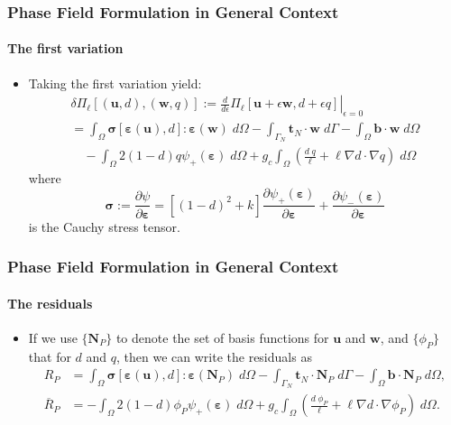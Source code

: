 \documentclass{beamer}
\newcommand{\SectionTwo}{Phase Field Formulation in General Context}
\begin{document}
\begin{frame}[label=subfstvar]
	\frametitle{\SectionTwo}
	\framesubtitle{The first variation}
	\begin{itemize}
		\setlength\itemsep{2em}
		\item Taking the first variation yield:
		\begin{multline*}
		\delta \Pi_\ell[(\bm{u}, d), (\bm{w}, q)] :=  \left.\frac{d}{d\epsilon} \Pi_\ell[\bm{u} + \epsilon\bm{w}, d + \epsilon q]\right|_{\epsilon=0} \\
		=\int_\Omega \bm{\sigma}[\bm{\varepsilon}(\bm{u}), d] : \bm{\varepsilon}(\bm{w}) \;d\Omega - \int_{\Gamma_N} \bm{t}_N\cdot \bm{w} \; d\Gamma - \int_\Omega \mathbf{b}\cdot\bm{w} \; d\Omega \\
		\quad - \int_\Omega 2(1-d) q \psi_+(\bm{\varepsilon}) \; d\Omega + 
		g_c\int_\Omega\left(\frac{d\;q}{\ell} + \ell \nabla d\cdot\nabla q\right)\;d\Omega
		\end{multline*}
		where 
		\begin{equation*}
		\bm{\sigma}:=\frac{\partial\psi}{\partial\bm{\varepsilon}} = \left[(1-d)^2 + k\right] \frac{\partial\psi_+(\bm{\varepsilon})}{\partial\bm{\varepsilon}} + \frac{\partial\psi_-(\bm{\varepsilon})}{\partial\bm{\varepsilon}}
		\end{equation*}
		is the Cauchy stress tensor.
	\end{itemize}
	\hyperlink{staticweak}{}
\end{frame}

\begin{frame}[label=subfstvarii]
	\frametitle{\SectionTwo}
	\framesubtitle{The residuals}
	\begin{itemize}
		\setlength\itemsep{2em}
		\item If we use $\{\mathbf{N}_P\}$ to denote the set of basis functions for $\bm{u}$ and $\bm{w}$, and $\{\phi_P\}$ that for $d$ and $q$, then we can write the residuals as
		\begin{align*}
		R_P &= \int_\Omega \bm{\sigma}[\bm{\varepsilon}(\bm{u}), d] : \bm{\varepsilon}(\mathbf{N}_P) \;d\Omega - \int_{\Gamma_N} \bm{t}_N\cdot \mathbf{N}_P \; d\Gamma - \int_\Omega \mathbf{b}\cdot\mathbf{N}_P \; d\Omega, \\
		\overline{R}_P &= - \int_\Omega 2(1-d) \phi_P \psi_+(\bm{\varepsilon}) \; d\Omega + 
		g_c\int_\Omega  \left(\frac{d\;\phi_P}{\ell} + \ell \nabla d\cdot\nabla \phi_P\right)\;d\Omega.
		\end{align*}		
	\end{itemize}
	\hyperlink{fenics}{}
\end{frame}
\end{document}
